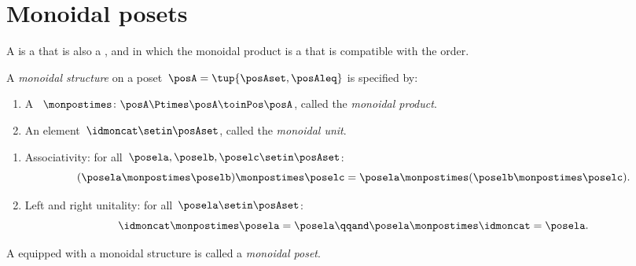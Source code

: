 
\section{Monoidal posets}
\label{sec:monoidal-posets}

A  is a  that is also a , and in which the monoidal product is a  that is compatible with the order.

\begin{ctdefinition}
    \label{def:monoidal-poset}
    A \emph{monoidal structure} on a poset~$\posA = \tup{\posAset, \posAleq}$ is specified by:

    \constit
    \begin{enumerate}
        \item A ~$\monpostimes \colon \posA \Ptimes \posA \toinPos \posA$, called the \emph{monoidal product}.
        \item An element~$\idmoncat \setin \posAset$, called the \emph{monoidal unit}.
    \end{enumerate}

    \condit
    \begin{enumerate}
        \item Associativity: for all~$\posela, \poselb, \poselc \setin \posAset$:
              \begin{equation}
                  (\posela \monpostimes \poselb)
                  \monpostimes \poselc =  \posela  \monpostimes ( \poselb \monpostimes \poselc).
              \end{equation}
        \item Left and right unitality: for all~$\posela \setin \posAset$:
              \begin{equation}
                  \idmoncat \monpostimes \posela = \posela
                  \qqand
                  \posela \monpostimes \idmoncat = \posela.
              \end{equation}
    \end{enumerate}

    \noindent A  equipped with a monoidal structure is called a \emph{monoidal poset}.
\end{ctdefinition}


